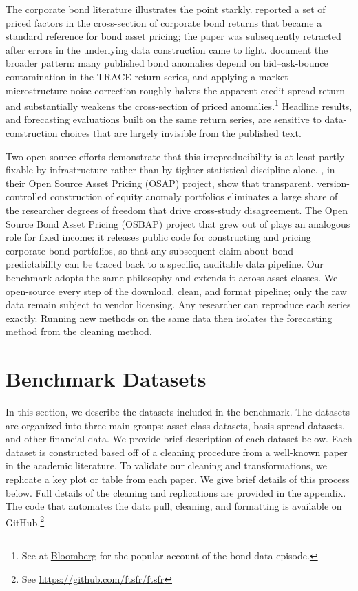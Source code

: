 \documentclass{article}
\begin{document}
The corporate bond literature illustrates the point starkly. \citet{Bai2019} reported a set of priced factors in the cross-section of corporate bond returns that became a standard reference for bond asset pricing; the paper was subsequently retracted after errors in the underlying data construction came to light. \citet{Dickerson2024} document the broader pattern: many published bond anomalies depend on bid--ask-bounce contamination in the TRACE return series, and applying a market-microstructure-noise correction roughly halves the apparent credit-spread return and substantially weakens the cross-section of priced anomalies.\footnote{See \citet{Lee2023} at \href{https://www.bloomberg.com/news/articles/2023-12-01/a-grad-school-number-cruncher-shakes-up-the-world-of-bond-quants}{Bloomberg} for the popular account of the bond-data episode.} Headline results, and forecasting evaluations built on the same return series, are sensitive to data-construction choices that are largely invisible from the published text.

Two open-source efforts demonstrate that this irreproducibility is at least partly fixable by infrastructure rather than by tighter statistical discipline alone. \citet{Chen2022}, in their Open Source Asset Pricing (OSAP) project, show that transparent, version-controlled construction of equity anomaly portfolios eliminates a large share of the researcher degrees of freedom that drive cross-study disagreement. The Open Source Bond Asset Pricing (OSBAP) project that grew out of \citet{Dickerson2023} plays an analogous role for fixed income: it releases public code for constructing and pricing corporate bond portfolios, so that any subsequent claim about bond predictability can be traced back to a specific, auditable data pipeline. Our benchmark adopts the same philosophy and extends it across asset classes. We open-source every step of the download, clean, and format pipeline; only the raw data remain subject to vendor licensing. Any researcher can reproduce each series exactly. Running new methods on the same data then isolates the forecasting method from the cleaning method.


\section{Benchmark Datasets}

In this section, we describe the datasets included in the benchmark. The datasets are organized into three main groups: asset class datasets, basis spread datasets, and other financial data. We provide brief description of each dataset below. Each dataset is constructed based off of a cleaning procedure from a well-known paper in the academic literature. To validate our cleaning and transformations, we replicate a key plot or table from each paper. We give brief details of this process below. Full details of the cleaning and replications are provided in the appendix.
The code that automates the data pull, cleaning, and formatting is available on GitHub.\footnote{See \url{https://github.com/ftsfr/ftsfr}}
\end{document}
